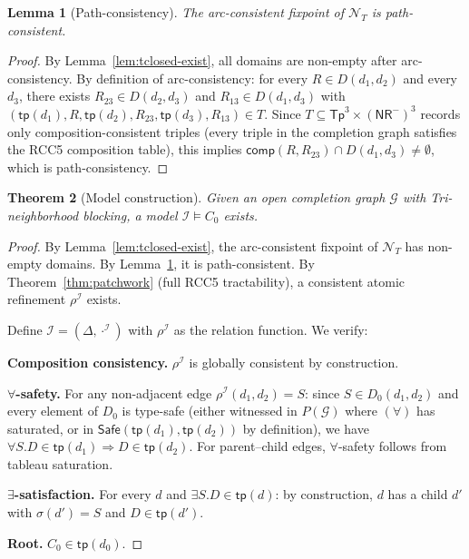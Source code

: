 \documentclass[a4paper,11pt]{article}
\newtheorem{theorem}{Theorem}[section]
\newtheorem{lemma}[theorem]{Lemma}
\theoremstyle{definition}
\newcommand{\comp}{\ensuremath{\mathsf{comp}}}
\newcommand{\tp}{\ensuremath{\mathsf{tp}}}
\newcommand{\Tp}{\ensuremath{\mathsf{Tp}}}
\newcommand{\NR}{\ensuremath{\mathsf{NR}}}
\newcommand{\Safe}{\ensuremath{\mathsf{Safe}}}
\newcommand{\interp}{\ensuremath{\mathcal{I}}}
\newcommand{\GG}{\ensuremath{\mathcal{G}}}
\newcommand{\NN}{\ensuremath{\mathcal{N}}}
\begin{document}
\begin{lemma}[Path-consistency]\label{lem:ac-preserve}
The arc-consistent fixpoint of $\NN_T$ is path-consistent.
\end{lemma}

\begin{proof}
By Lemma~\ref{lem:tclosed-exist}, all domains are non-empty
after arc-consistency.  By definition of arc-consistency:
for every $R \in D(d_1, d_2)$ and every $d_3$, there exists
$R_{23} \in D(d_2, d_3)$ and $R_{13} \in D(d_1, d_3)$
with $(\tp(d_1), R, \tp(d_2), R_{23}, \tp(d_3), R_{13})
\in T$.  Since $T \subseteq \Tp^3 \times (\NR^{-})^3$ records
only composition-consistent triples (every triple in
the completion graph satisfies the RCC5 composition table),
this implies $\comp(R, R_{23}) \cap D(d_1, d_3) \neq
\emptyset$, which is path-consistency.
\end{proof}

\begin{theorem}[Model construction]\label{thm:model}
Given an open completion graph $\GG$ with Tri-neighborhood
blocking, a model $\interp \models C_0$ exists.
\end{theorem}

\begin{proof}
By Lemma~\ref{lem:tclosed-exist}, the arc-consistent fixpoint
of $\NN_T$ has non-empty domains.  By
Lemma~\ref{lem:ac-preserve}, it is path-consistent.  By
Theorem~\ref{thm:patchwork} (full RCC5 tractability), a consistent
atomic refinement $\rho^{\interp}$ exists.

Define $\interp = (\Delta, \cdot^{\interp})$ with
$\rho^{\interp}$ as the relation function.  We verify:

\medskip\noindent\textbf{Composition consistency.}\;
$\rho^{\interp}$ is globally consistent by construction.

\medskip\noindent\textbf{$\forall$-safety.}\;
For any non-adjacent edge $\rho^{\interp}(d_1, d_2) = S$:
since $S \in D_0(d_1, d_2)$ and every element of $D_0$ is
type-safe (either witnessed in $P(\GG)$ where $(\forall)$
has saturated, or in $\Safe(\tp(d_1), \tp(d_2))$ by
definition), we have $\forall S.D \in \tp(d_1) \Rightarrow
D \in \tp(d_2)$.  For parent--child edges, $\forall$-safety
follows from tableau saturation.

\medskip\noindent\textbf{$\exists$-satisfaction.}\;
For every $d$ and $\exists S.D \in \tp(d)$: by construction,
$d$ has a child $d'$ with $\sigma(d') = S$ and
$D \in \tp(d')$.

\medskip\noindent\textbf{Root.}\; $C_0 \in \tp(d_0)$.
\end{proof}
\end{document}
